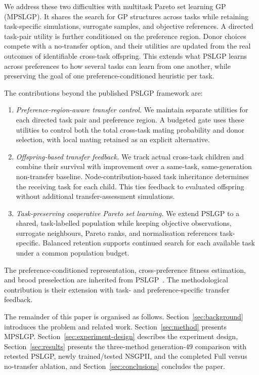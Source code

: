 \documentclass[10pt,journal]{IEEEtran}
\newcommand{\resultrevision}[1]{\textcolor{resultrevision}{#1}}
\begin{document}
We address these two difficulties with multitask Pareto set learning GP (MPSLGP). It shares the search for GP structures across tasks while retaining task-specific simulations, surrogate samples, and objective references. A directed task-pair utility is further conditioned on the preference region. Donor choices compete with a no-transfer option, and their utilities are updated from the real outcomes of identifiable cross-task offspring. This extends what PSLGP learns across preferences to how several tasks can learn from one another, while preserving the goal of one preference-conditioned heuristic per task.

The contributions beyond the published PSLGP framework are:
\begin{enumerate}[leftmargin=*,nosep]
    \item \emph{Preference-region-aware transfer control.} We maintain separate utilities for each directed task pair and preference region. A budgeted gate uses these utilities to control both the total cross-task mating probability and donor selection, with local mating retained as an explicit alternative.
    \item \emph{Offspring-based transfer feedback.} We track actual cross-task children and combine their survival with improvement over a same-task, same-generation non-transfer baseline. Node-contribution-based task inheritance determines the receiving task for each child. This ties feedback to evaluated offspring without additional transfer-assessment simulations.
    \item \emph{Task-preserving cooperative Pareto set learning.} We extend PSLGP to a shared, task-labelled population while keeping objective observations, surrogate neighbours, Pareto ranks, and normalisation references task-specific. Balanced retention supports continued search for each available task under a common population budget.
\end{enumerate}
The preference-conditioned representation, cross-preference fitness estimation, and brood preselection are inherited from PSLGP~\cite{xu2026pslgp}. The methodological contribution is their extension with task- and preference-specific transfer feedback.

The remainder of this paper is organised as follows. Section~\ref{sec:background} introduces the problem and related work. Section~\ref{sec:method} presents MPSLGP. Section~\ref{sec:experiment-design} describes the experiment design, Section~\ref{sec:results} presents \resultrevision{the three-method generation-49 comparison with retested PSLGP, newly trained/tested NSGPII, and the completed Full versus no-transfer ablation}, and Section~\ref{sec:conclusions} concludes the paper.
\end{document}
